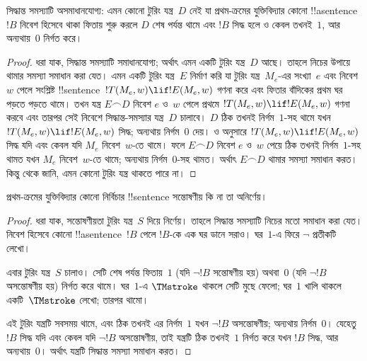 \documentclass[../../../include/open-logic-section]{subfiles}
\begin{document}

\begin{thm}
সিদ্ধান্ত সমস্যাটি অসমাধানযোগ্য: এমন কোনো টুরিং যন্ত্র~$D$ নেই যা
প্রথম-ক্রমের যুক্তিবিদ্যার কোনো !!a{sentence}~$!B$ নিবেশ হিসেবে থাকা
ফিতায় শুরু করলে $D$ শেষ পর্যন্ত থামে এবং $!B$ সিদ্ধ হলে ও কেবল তখনই~$1$,
আর অন্যথায়~$0$ নির্গত করে।
\end{thm}

\begin{proof}
ধরা যাক, সিদ্ধান্ত সমস্যাটি সমাধানযোগ্য; অর্থাৎ এমন একটি টুরিং যন্ত্র~$D$
আছে। তাহলে নিচের উপায়ে থামার সমস্যা সমাধান করা যেত। এমন একটি টুরিং
যন্ত্র~$E$ নির্মাণ করি যা টুরিং যন্ত্র~$M_e$-এর সংখ্যা~$e$ এবং নিবেশ~$w$
পেলে সংশ্লিষ্ট !!{sentence}~$!T(M_e,w)\lif !E(M_e,w)$ গণনা করে এবং
ফিতার বাঁদিকের প্রথম ঘর পড়তে পড়তে থামে। তখন যন্ত্র $E\frown D$ নিবেশ
$e$ ও~$w$ পেলে প্রথমে $!T(M_e,w)\lif !E(M_e,w)$ গণনা করবে এবং তারপর সেই
নিবেশে সিদ্ধান্ত-সমস্যার যন্ত্র~$D$ চালাবে। $D$ ঠিক তখনই নির্গম~$1$-সহ
থামে যখন $!T(M_e,w)\lif !E(M_e,w)$ সিদ্ধ; অন্যথায় নির্গম~$0$ দেয়।
 ও  অনুসারে
$!T(M_e,w)\lif !E(M_e,w)$ সিদ্ধ যদি এবং কেবল যদি $M_e$ নিবেশ~$w$-তে
থামে। ফলে $E\frown D$ নিবেশ $e$ ও~$w$ পেয়ে ঠিক তখনই নির্গম~$1$-সহ
থামত যখন $M_e$ নিবেশ~$w$-তে থামে; অন্যথায় নির্গম~$0$-সহ থামত। অর্থাৎ
$E\frown D$ থামার সমস্যা সমাধান করত। কিন্তু
 থেকে জানি, এমন কোনো টুরিং যন্ত্র থাকতে
পারে না।

\end{proof}

\begin{cor}%
প্রথম-ক্রমের যুক্তিবিদ্যার কোনো নির্বিচার !!{sentence} সন্তোষণীয় কি না তা
অনির্ণেয়।
\end{cor}

\begin{proof}
  ধরা যাক, সন্তোষণীয়তা টুরিং যন্ত্র~$S$ দিয়ে নির্ণেয়। তাহলে সিদ্ধান্ত
  সমস্যাটি নিচের মতো সমাধান করা যেত। নিবেশ হিসেবে কোনো
  !!a{sentence}~$!B$ পেলে $!B$-কে এক ঘর ডানে সরাও। ঘর~$1$-এ ফিরে
  $\lnot$ প্রতীকটি লেখো।


  এবার টুরিং যন্ত্র~$S$ চালাও। সেটি শেষ পর্যন্ত ফিতায়~$1$ (যদি
  $\lnot !B$ সন্তোষণীয় হয়) অথবা~$0$ (যদি $\lnot !B$ অসন্তোষণীয় হয়)
  নির্গত করে থামে। ঘর~$1$-এ $\TMstroke$ থাকলে সেটি মুছে ফেলো; ঘর~$1$
  খালি থাকলে একটি~$\TMstroke$ লেখো; তারপর থামো।

  এই টুরিং যন্ত্রটি সবসময় থামে, এবং ঠিক তখনই এর নির্গম~$1$ যখন
  $\lnot !B$ অসন্তোষণীয়; অন্যথায় নির্গম~$0$। যেহেতু $!B$ সিদ্ধ যদি
  এবং কেবল যদি $\lnot !B$ অসন্তোষণীয়, তাই যন্ত্রটি ঠিক তখনই~$1$
  নির্গত করে যখন $!B$ সিদ্ধ, আর অন্যথায়~$0$। অর্থাৎ যন্ত্রটি সিদ্ধান্ত
  সমস্যা সমাধান করত।
\end{proof}
\end{document}
